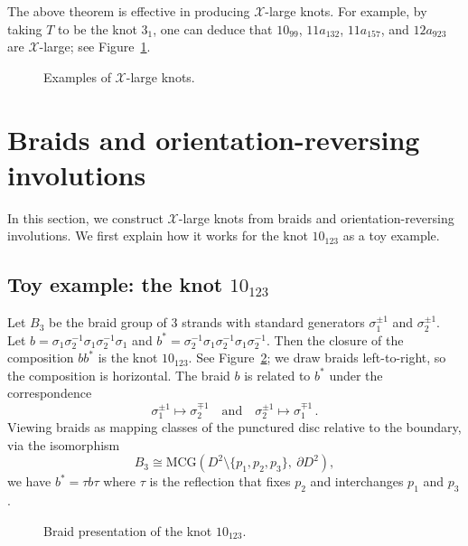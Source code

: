 \documentclass[12pt,reqno]{amsart}
\theoremstyle{definition}
\def\calX{\mathcal X}
\begin{document}
The above theorem is effective in producing $\calX$-large knots. For example, by taking $T$ to be the knot $3_1$, one can deduce that $10_{99}$, $11a_{132}$, $11a_{157}$, and $12a_{923}$ are $\calX$-large; see
Figure~\ref{fig.11a157}. 
\begin{figure}[!htbp]
    \centering
     \scalebox{0.9}{}
    \caption{Examples of $\calX$-large knots.}
    \label{fig.11a157}
\end{figure}
    
\section{Braids and orientation-reversing involutions}
\label{sec.invol}

In this section, we construct $\calX$-large knots from braids and orientation-reversing involutions. 
We first explain how it works for the knot $10_{123}$ as a toy example.

\subsection{Toy example: the knot $10_{123}$}
\label{sec.10123}

Let $B_3$ be the braid group of 3 strands with standard generators $\sigma_1^{\pm1}$ and $\sigma_2^{\pm1}$. Let $b=\sigma_1 \sigma_2^{-1} \sigma_1 \sigma_2^{-1} \sigma_1$ and
$b^* = \sigma_2^{-1} \sigma_1 \sigma_2^{-1} \sigma_1\sigma_2^{-1}$. Then the closure of the composition $bb^*$ is the knot $10_{123}$. See Figure~\ref{fig.10123}; we  draw braids left-to-right, so the composition is horizontal. The braid
$b$ is related to $b^*$ under the correspondence
\begin{equation}
    \label{eqn.bij}
    \sigma_{1}^{\pm1} \longmapsto \sigma_{2}^{\mp1} \quad \text{and} \quad \sigma_{2}^{\pm1} \longmapsto \sigma_{1}^{\mp1}\,.
\end{equation}
Viewing braids as mapping classes of
the punctured disc relative to the boundary, via the isomorphism
\begin{equation*}
B_3\cong\mathrm{MCG}(D^2 \setminus \{p_1,p_2,p_3\},\  \partial D^2),
\end{equation*}
we have $b^\ast = \tau b \tau$ where $\tau$ is the reflection that fixes $p_2$ and interchanges $p_1$ and $p_3$. 

\begin{figure}[!htbp]
    \centering
     \scalebox{1}{}
    \caption{Braid presentation of the knot $10_{123}$.}
    \label{fig.10123}
\end{figure}
\end{document}
